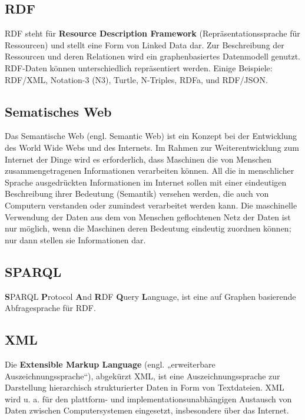 \documentclass[11pt,a4paper]{article}
\begin{document}
\subsection{RDF}
RDF steht für \textbf{Resource Description Framework} (Repräsentationssprache für Ressourcen) und stellt eine
Form von Linked Data dar. Zur Beschreibung der Ressourcen und deren Relationen wird ein 
graphenbasiertes Datenmodell genutzt. RDF-Daten können unterschiedlich repräsentiert werden.
Einige Beispiele: RDF/XML, Notation-3 (N3), Turtle, N-Triples, RDFa, und RDF/JSON.
\subsection{Sematisches Web}
Das Semantische Web (engl. Semantic Web) ist ein Konzept bei der Entwicklung des World Wide Webs und des   Internets. Im Rahmen zur Weiterentwicklung zum Internet der Dinge wird es erforderlich, dass Maschinen die von   Menschen  zusammengetragenen Informationen verarbeiten können. All die   in  menschlicher Sprache ausgedrückten Informationen im Internet sollen   mit  einer eindeutigen Beschreibung ihrer Bedeutung (Semantik)   versehen  werden, die auch von Computern verstanden oder zumindest   verarbeitet  werden kann. Die maschinelle Verwendung der Daten aus dem   von Menschen  geflochtenen Netz der Daten ist nur möglich, wenn die   Maschinen deren  Bedeutung eindeutig zuordnen können; nur dann stellen   sie Informationen  dar.
\subsection{SPARQL}
\textbf{S}PARQL \textbf{P}rotocol \textbf{A}nd \textbf{R}DF \textbf{Q}uery \textbf{L}anguage, ist eine auf Graphen basierende Abfragesprache für RDF.
\subsection{XML}
Die \textbf{Extensible Markup Language} (engl. „erweiterbare Auszeichnungssprache“), abgekürzt XML, ist eine Auszeichnungssprache zur Darstellung hierarchisch strukturierter Daten in Form von Textdateien. XML wird u. a. für den plattform- und implementationsunabhängigen Austausch von Daten zwischen Computersystemen eingesetzt, insbesondere über das Internet.

\clearpage
\end{document}
